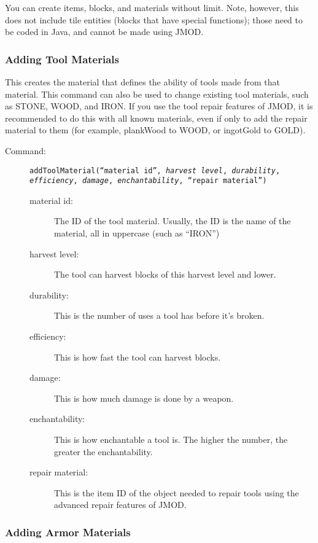 \documentclass[letterpaper,titlepage,12pt]{article}
\begin{document}
You can create items, blocks, and materials without limit.  Note, however, this does not include tile entities (blocks that have special functions); those need to be coded in Java, and cannot be made using JMOD.

\subsubsection{Adding Tool Materials}

This creates the material that defines the ability of tools made from that material.  This command can also be used to change existing tool materials, such as STONE, WOOD, and IRON.  If you use the tool repair features of JMOD, it is recommended to do this with all known materials, even if only to add the repair material to them (for example, plankWood to WOOD, or ingotGold to GOLD).

\begin{description}
\item[Command:] \texttt{addToolMaterial(``\emph{material id}'', \emph{harvest level}, \emph{durability}, \emph{efficiency}, \emph{damage}, \emph{enchantability}, ``\emph{repair material}'')}

\begin{description}
\item [material id:] The ID of the tool material.  Usually, the ID is the name of the material, all in uppercase (such as ``IRON'')
\item [harvest level:] The tool can harvest blocks of this harvest level and lower.
\item [durability:] This is the number of uses a tool has before it's broken.
\item [efficiency:] This is how fast the tool can harvest blocks.
\item [damage:] This is how much damage is done by a weapon.
\item [enchantability:] This is how enchantable a tool is.  The higher the number, the greater the enchantability.
\item [repair material:] This is the item ID of the object needed to repair tools using the advanced repair features of JMOD.
\end{description}
\end{description}

\subsubsection{Adding Armor Materials}
\end{document}
